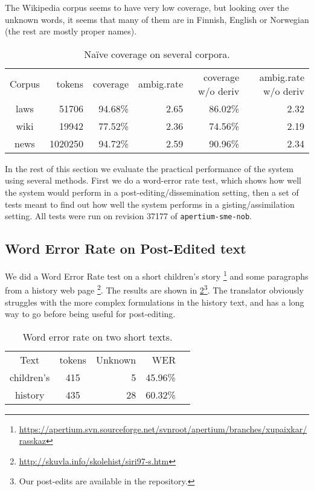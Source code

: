 The Wikipedia corpus seems to have very low coverage, but looking over
the unknown words, it seems that many of them are in Finnish, English
or Norwegian (the rest are mostly proper names).


\begin{table}
  \begin{center}
  \begin{tabular}{crrrrr}
   Corpus     & tokens   & coverage & ambig.rate  & coverage w/o deriv & ambig.rate w/o deriv \\
   laws       &  51706   & 94.68\%  & 2.65        & 86.02\%            & 2.32 \\
   wiki       & 19942    & 77.52\%  & 2.36        & 74.56\%            & 2.19 \\
   news       & 1020250  & 94.72\%  & 2.59        & 90.96\%            & 2.34 \\
  \end{tabular}
    \caption{Naïve coverage on several corpora.}
    \label{table:cov}
  \end{center}
\end{table}
In the rest of this section we evaluate the practical performance of
the system using several methods. First we do a word-error rate test,
which shows how well the system would perform in a
post-editing/dissemination setting, then a set of tests meant to find
out how well the system performs in a gisting/assimilation setting.
All tests were run on revision 37177 of \texttt{apertium-sme-nob}.



\subsection{Word Error Rate on Post-Edited text}
\label{sec:WER}
We did a Word Error Rate test on a short children's story
\footnote{\href{https://apertium.svn.sourceforge.net/svnroot/apertium/branches/xupaixkar/rasskaz}{https://apertium.svn.sourceforge.net/svnroot/apertium/branches/xupaixkar/rasskaz}}
and some paragraphs from a history web page
\footnote{\href{http://skuvla.info/skolehist/siri97-s.htm}{http://skuvla.info/skolehist/siri97-s.htm}}.
The results are shown in \ref{table:wer}\footnote{Our post-edits are
  available in the repository.}. The translator obviously struggles
with the more complex formulations in the history text, and has a long
way to go before being useful for post-editing.


\begin{table}
  \begin{center}
  \begin{tabular}{ccrrr}
   Text       & tokens & Unknown & WER  \\
   children's & 415     & 5      & 45.96\% \\
   history    & 435     & 28     & 60.32\%  \\
  \end{tabular}
    \caption{Word error rate on two short texts.}
    \label{table:wer}
  \end{center}
\end{table}


